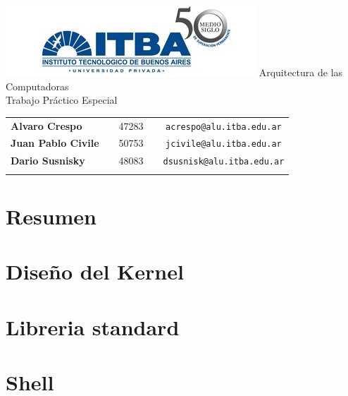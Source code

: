 \documentclass[a4paper,10pt]{article}
\begin{document}
\begin{titlepage}
        \thispagestyle{empty}
        \begin{center}
                \includegraphics{./images/itba.jpg}
                \vfill
                \Huge{Arquitectura de las Computadoras}\\
                \vspace{1cm}
                \huge{Trabajo Práctico Especial}\\
        \end{center}
        \vspace{2cm}
        \large{
                \begin{tabular}{lcrc}
                        \textbf{Alvaro Crespo} & & 47283 & \ \ \texttt{acrespo@alu.itba.edu.ar}\\
                        \textbf{Juan Pablo Civile} & & 50753 & \ \ \texttt{jcivile@alu.itba.edu.ar}\\
                        \textbf{Dario Susnisky} & & 48083 & \ \ \texttt{dsusnisk@alu.itba.edu.ar}\\
                        \\ 
                \end{tabular}
        }
        \vfill
\end{titlepage}

\setcounter{page}{1}

\tableofcontents
\newpage

\section{Resumen}
\section{Diseño del Kernel}
\section{Libreria standard}
\section{Shell}
\end{document}
